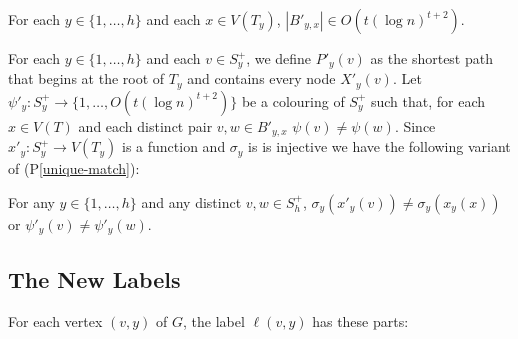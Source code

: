 \documentclass{patmorin}
\newcommand{\pref}[1]{(P\ref{#1})}
\newcommand{\psref}[1]{(P\ref{#1}$^{\star}$)}
\begin{document}
\begin{compactenum}[(P1$^{\star}$)]\setcounter{enumi}{2}
    \item For each $y\in\{1,\ldots,h\}$ and each $x\in V(T_y)$, $|B'_{y,x}|\in O(t(\log n)^{t+2})$. \label{small-bags-ii}
\end{compactenum}


For each $y\in\{1,\ldots,h\}$ and each $v\in S^+_y$, we define $P'_y(v)$ as the shortest path that begins at the root of $T_y$ and contains every node $X'_y(v)$.  Let $\psi'_y:S^+_y\to\{1,\ldots,O(t(\log n)^{t+2})\}$ be a colouring of $S^+_y$ such that, for each $x\in V(T)$ and each distinct pair $v,w\in B'_{y,x}$ $\psi(v)\neq\psi(w)$.  Since $x'_y:S^+_y\to V(T_y)$ is a function and $\sigma_y$ is is injective we have the following variant of \pref{unique-match}:

\begin{compactenum}[(P1$^\star$)]\setcounter{enumi}{3}
    \item For any $y\in\{1,\ldots,h\}$ and any distinct $v,w\in S^+_h$, $\sigma_y(x'_y(v))\neq \sigma_y(x_y(x)) $ or $\psi'_y(v)\neq\psi'_y(w)$.\label{unique-match-ii}
\end{compactenum}

\subsection{The New Labels}


For each vertex $(v,y)$ of $G$, the label $\ell(v,y)$ has these parts:
\end{document}
